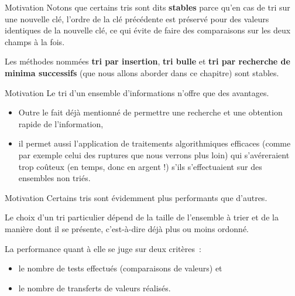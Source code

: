 \begin{frame}{Motivation}
	Notons que certains tris sont dits \textbf{stables} parce
	qu'en cas de tri sur une nouvelle clé, l’ordre de la
	clé précédente est préservé pour des valeurs identiques de la nouvelle
	clé, ce qui évite de faire des comparaisons sur les deux champs à la
	fois. 
	
	\bigskip
	
	Les méthodes nommées \textbf{tri par insertion}, \textbf{tri
	bulle} et \textbf{tri par recherche de minima successifs }(que nous
	allons aborder dans ce chapitre) sont stables.
\end{frame}

\begin{frame}{Motivation}
	Le tri d’un ensemble d’informations n’offre que des avantages. 
	
	\begin{itemize}
		\item
		Outre le fait déjà mentionné de permettre une recherche et une obtention rapide
		de l’information, 
		\item
		il permet aussi l’application de traitements
		algorithmiques efficaces (comme par exemple celui des ruptures que nous
		verrons plus loin) qui s’avéreraient trop coûteux (en temps, donc en
		argent !) s’ils s’effectuaient sur des ensembles non triés.
	\end{itemize}
\end{frame}

\begin{frame}{Motivation}
	Certains tris sont évidemment plus performants que d’autres. 
	
	\bigskip
	
	Le choix
	d’un tri particulier dépend de la taille de l’ensemble à trier et de la
	manière dont il se présente, c’est-à-dire déjà plus ou moins ordonné.
	
	\bigskip
	
	La performance quant à elle se juge sur deux critères~: 
	\begin{itemize}
		\item
		le nombre de tests effectués (comparaisons de valeurs) et 
		\item
		le nombre de transferts de valeurs réalisés. 
	\end{itemize}
\end{frame}

